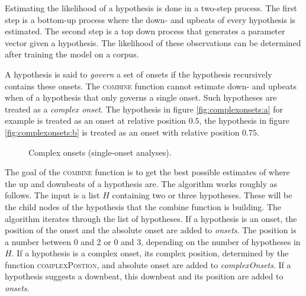Estimating the likelihood of a hypothesis is done in a two-step process. The first step is a bottom-up process where the down- and upbeats of every hypothesis is estimated. The second step is a top down process that generates a parameter vector given a hypothesis. The likelihood of these observations can be determined after training the model on a corpus.

A hypothesis is said to \textit{govern} a set of onsets if the hypothesis recursively contains these onsets. The \textsc{combine} function cannot estimate down- and upbeats when of a hypothesis that only governs a single onset. Such hypotheses are treated as a \textit{complex onset}. The hypothesis in figure \ref{fig:complexonsets:a} for example is treated as an onset at relative position $0.5$, the hypothesis in figure \ref{fig:complexonsets:b} is treated as an onset with relative position $0.75$.

\begin{figure}
\centering
{}
\caption{Complex onsets (single-onset analyses).}
\label{fig:complexonsets}
\end{figure}

The goal of the \textsc{combine} function is to get the best possible estimates of where the up and downbeats of a hypothesis are. The algorithm works roughly as follows. The input is a list $H$ containing two or three hypotheses. These will be the child nodes of the hypothesis that the combine function is building. The algorithm iterates through the list of hypotheses. If a hypothesis is an onset, the position of the onset and the absolute onset are added to \textit{onsets}. The position is a number between 0 and 2 or 0 and 3, depending on the number of hypotheses in $H$. If a hypothesis is a complex onset, its complex position, determined by the function \textsc{complexPostion}, and absolute onset are added to \textit{complexOnsets}. If a hypothesis suggests a downbeat, this downbeat and its position are added to \textit{onsets}.

